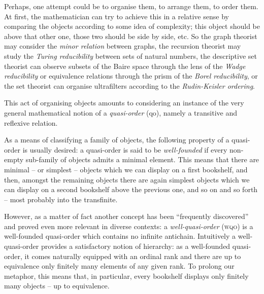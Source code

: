 \documentclass{article}%
\theoremstyle{plain}
\theoremstyle{definition}
\theoremstyle{remark}
\newcommand{\wqo}{\textsc{wqo}}
\begin{document}
Perhaps, one attempt could be to organise them, to arrange them, to order them.
At first, the mathematician can try to achieve this in a relative sense by comparing the objects according to some idea of complexity; 
this object should be above that other one, those two should be side by side, etc. 
So the graph theorist may consider the \emph{minor relation} between graphs, the recursion theorist may study the \emph{Turing reducibility} between sets of natural numbers, the descriptive set theorist can observe subsets of the Baire space through the lens of the \emph{Wadge reducibility} or equivalence relations through the prism of the \emph{Borel reducibility}, or the set theorist can organise ultrafilters according to the \emph{Rudin-Keisler ordering}.

This act of organising objects amounts to considering an instance of the very general mathematical notion of a \emph{quasi-order} (qo), namely a transitive and reflexive relation. 

As a means of classifying a family of objects, the following property of a quasi-order is usually desired: a quasi-order is said to be \emph{well-founded} if every non-empty sub-family of objects admits a minimal element. This means that there are minimal -- or simplest -- objects which we can display on a first bookshelf, and then, amongst the remaining objects there are again simplest objects which we can display on a second bookshelf above the previous one, and so on and so forth -- most probably into the transfinite.

However, as a matter of fact another concept has been \enquote{frequently discovered} \cite{kruskal1972theory} and proved even more relevant in diverse contexts: a \emph{well-quasi-order} (\wqo{}) is a well-founded quasi-order which contains no infinite antichain. Intuitively a well-quasi-order provides a satisfactory notion of hierarchy: as a well-founded quasi-order, it comes naturally equipped with an ordinal rank and there are up to equivalence only finitely many elements of any given rank. To prolong our metaphor, this means that, in particular, every bookshelf displays only finitely many objects -- up to equivalence.
\end{document}
